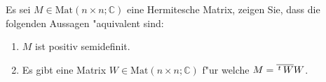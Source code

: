 \documentclass[a4,11pt]{article}
\begin{document}
 \begin{aufgabe}[4 Punkte]
 Es sei $M \in \text{Mat}(n \times n; \mathbb{C})$ eine Hermitesche
 Matrix, zeigen Sie, dass die folgenden Aussagen "aquivalent sind:
 \begin{enumerate}
 \item $M$ ist positiv semidefinit.
 \item Es gibt eine Matrix $W \in \text{Mat}(n\times n;\mathbb{C})$
   f"ur welche $M = \overline{\,^t\!\ W} W$.
 \end{enumerate}
 \end{aufgabe}


\end{document}
